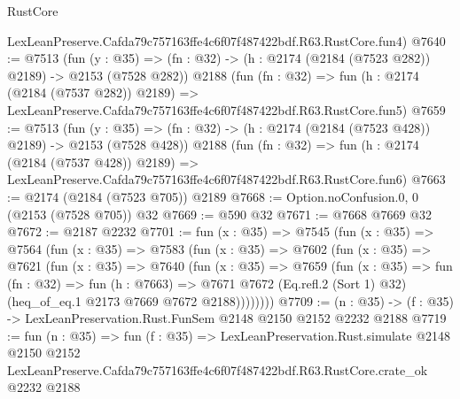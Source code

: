 \begin{lexlean}{RustCore}
\begin{coremodule}
    LexLeanPreserve.Cafda79c757163ffe4c6f07f487422bdf.R63.RustCore.fun4)
@7640 := @7513
    (fun (y : @35) => (fn : @32) -> (h : @2174 (@2184 (@7523 @282)) @2189) -> @2153 (@7528 @282))
    @2188
    (fun (fn : @32) =>
    fun (h : @2174 (@2184 (@7537 @282)) @2189) =>
    LexLeanPreserve.Cafda79c757163ffe4c6f07f487422bdf.R63.RustCore.fun5)
@7659 := @7513
    (fun (y : @35) => (fn : @32) -> (h : @2174 (@2184 (@7523 @428)) @2189) -> @2153 (@7528 @428))
    @2188
    (fun (fn : @32) =>
    fun (h : @2174 (@2184 (@7537 @428)) @2189) =>
    LexLeanPreserve.Cafda79c757163ffe4c6f07f487422bdf.R63.RustCore.fun6)
@7663 := @2174 (@2184 (@7523 @705)) @2189
@7668 := Option.noConfusion.{0, 0} (@2153 (@7528 @705)) @32
@7669 := @590 @32
@7671 := @7668 @7669 @32
@7672 := @2187 @2232
@7701 := fun (x : @35) =>
  @7545
    (fun (x : @35) =>
    @7564
      (fun (x : @35) =>
      @7583
        (fun (x : @35) =>
        @7602
          (fun (x : @35) =>
          @7621
            (fun (x : @35) =>
            @7640
              (fun (x : @35) =>
              @7659
                (fun (x : @35) =>
                fun (fn : @32) =>
                fun (h : @7663) =>
                @7671
                  @7672
                  (Eq.refl.{2} (Sort 1) @32)
                  (heq_of_eq.{1} @2173 @7669 @7672 @2188))))))))
@7709 := (n : @35) -> (f : @35) -> LexLeanPreservation.Rust.FunSem @2148 @2150 @2152 @2232 @2188
@7719 := fun (n : @35) =>
  fun (f : @35) =>
  LexLeanPreservation.Rust.simulate
    @2148
    @2150
    @2152
    LexLeanPreserve.Cafda79c757163ffe4c6f07f487422bdf.R63.RustCore.crate_ok
    @2232
    @2188
\end{coremodule}
\end{lexlean}

